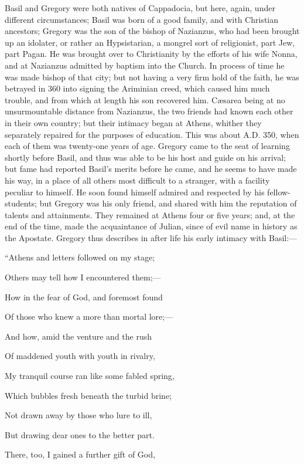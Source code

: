 Basil and Gregory were both natives of Cappadocia, but here, again,
under different circumstances; Basil was born of a good family, and
with Christian ancestors; Gregory was the son of the bishop of
Nazianzus, who had been brought up an idolater, or rather an
Hypsistarian, a mongrel sort of religionist, part Jew, part Pagan. He
was brought over to Christianity by the efforts of his wife Nonna, and
at Nazianzus admitted by baptism into the Church. In process of time
he was made bishop of that city; but not having a very firm hold of
the faith, he was betrayed in 360 into signing the Ariminian creed,
which caused him much trouble, and from which at length his son
recovered him. Cæsarea being at no unsurmountable distance from
Nazianzus, the two friends had known each other in their own country;
but their intimacy began at Athens, whither they separately repaired
for the purposes of education. This was about A.D.
350, when each of them was twenty-one years of age. Gregory came to
the seat of learning shortly before Basil, and thus was able to be his
host and guide on his arrival; but fame had reported Basil's merits
before he came, and he seems to have made his way, in a place of all
others most difficult to a stranger, with a facility peculiar to
himself. He soon found himself admired and respected by his
fellow-students; but Gregory was his only friend, and shared with him
the reputation of talents and attainments. They remained at Athens
four or five years; and, at the end of the time, made the acquaintance
of Julian, since of evil name in history as the Apostate. Gregory thus
describes in after life his early intimacy with Basil:—

``Athens and letters followed on my stage;

Others may tell how I encountered them;—

How in the fear of God, and foremost found

Of those who knew a more than mortal lore;—

And how, amid the venture and the rush

Of maddened youth with youth in rivalry,

My tranquil course ran like some fabled spring,

Which bubbles fresh beneath the turbid brine;

Not drawn away by those who lure to ill,

But drawing dear ones to the better part.

There, too, I gained a further gift of God,

